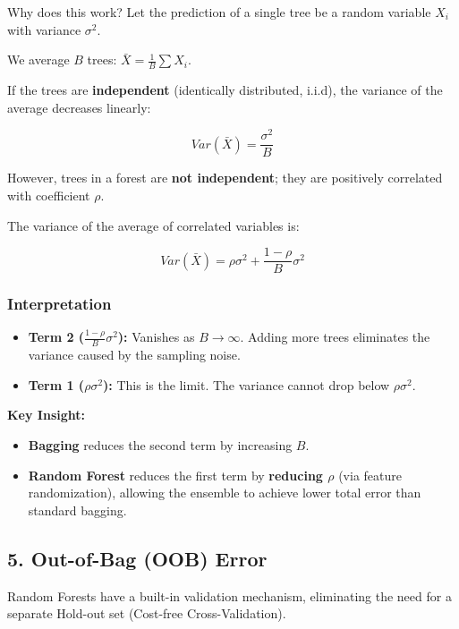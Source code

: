 \documentclass[
  italian,
  11pt,
]{article}
\begin{document}
Why does this work? Let the prediction of a single tree be a random
variable \(X_i\) with variance \(\sigma^2\).

We average \(B\) trees: \(\bar{X} = \frac{1}{B} \sum X_i\).

If the trees are \textbf{independent} (identically distributed, i.i.d),
the variance of the average decreases linearly:

\[Var(\bar{X}) = \frac{\sigma^2}{B}\]

However, trees in a forest are \textbf{not independent}; they are
positively correlated with coefficient \(\rho\).

The variance of the average of correlated variables is:

\[Var(\bar{X}) = \rho \sigma^2 + \frac{1-\rho}{B} \sigma^2\]

\subsubsection{Interpretation}\label{interpretation}

\begin{itemize}
\item
  \textbf{Term 2 (\(\frac{1-\rho}{B}\sigma^2\)):} Vanishes as
  \(B \to \infty\). Adding more trees eliminates the variance caused by
  the sampling noise.
\item
  \textbf{Term 1 (\(\rho \sigma^2\)):} This is the limit. The variance
  cannot drop below \(\rho \sigma^2\).
\end{itemize}

\textbf{Key Insight:}

\begin{itemize}
\item
  \textbf{Bagging} reduces the second term by increasing \(B\).
\item
  \textbf{Random Forest} reduces the first term by \textbf{reducing
  \(\rho\)} (via feature randomization), allowing the ensemble to
  achieve lower total error than standard bagging.
\end{itemize}

\subsection{5. Out-of-Bag (OOB) Error}\label{out-of-bag-oob-error}

Random Forests have a built-in validation mechanism, eliminating the
need for a separate Hold-out set (Cost-free Cross-Validation).
\end{document}
